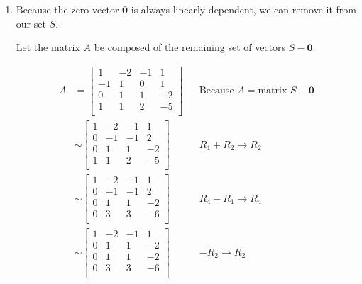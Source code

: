 \documentclass[10pt,letterpaper,final]{report}
\newcommand{\reason}[1]{&& \text{#1}}
\begin{document}
\begin{enumerate}[label=(\alph*)]
  \item Because the zero vector $\mathbf{0}$ is always linearly dependent, we can remove it from our set $S$.

        Let the matrix $A$ be composed of the remaining set of vectors $S - \mathbf{0}$.

        \begin{align*}
          A & = \begin{bmatrix}
                  1  & -2 & -1 & 1  \\
                  -1 & 1  & 0  & 1  \\
                  0  & 1  & 1  & -2 \\
                  1  & 1  & 2  & -5 \\
                \end{bmatrix} \reason{Because $A = \text{matrix } S - \mathbf{0}$} \\[1ex]
            & \sim \begin{bmatrix}
                     1 & -2 & -1 & 1  \\
                     0 & -1 & -1 & 2  \\
                     0 & 1  & 1  & -2 \\
                     1 & 1  & 2  & -5 \\
                   \end{bmatrix} \reason{$R_1 + R_2 \to R_2$}                      \\[1ex]
            & \sim \begin{bmatrix}
                     1 & -2 & -1 & 1  \\
                     0 & -1 & -1 & 2  \\
                     0 & 1  & 1  & -2 \\
                     0 & 3  & 3  & -6 \\
                   \end{bmatrix} \reason{$R_4 - R_1 \to R_4$}                      \\[1ex]
            & \sim \begin{bmatrix}
                     1 & -2 & -1 & 1  \\
                     0 & 1  & 1  & -2 \\
                     0 & 1  & 1  & -2 \\
                     0 & 3  & 3  & -6 \\
                   \end{bmatrix} \reason{$-R_2 \to R_2$}                           \\[1ex]

\end{align*}
\end{enumerate}
\end{document}

